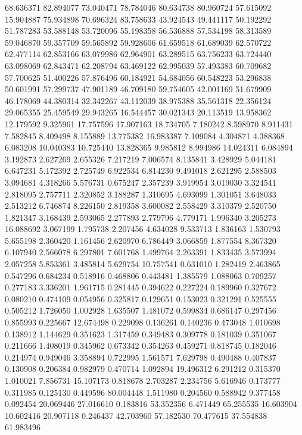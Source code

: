 68.636371
82.894077
73.040471
78.784046
80.634738
80.960724
57.615092
15.904887
75.934898
70.696324
83.758633
43.924543
49.441117
50.192292
51.787283
53.588148
53.720096
55.198358
56.536888
57.534198
58.313589
59.046870
59.357709
59.565892
59.928606
61.659518
61.689039
62.570722
62.477114
62.853166
63.079986
62.964901
63.289515
63.756233
63.724440
63.098069
62.843471
62.208794
63.469122
62.995039
57.493383
60.709682
57.700625
51.400226
57.876496
60.184921
54.684056
60.548223
53.296838
50.601991
57.299737
47.901189
46.709180
59.754605
42.001169
51.679909
46.178069
44.380314
32.342267
43.112039
38.975388
35.561318
22.356124
29.065355
25.459549
29.943265
16.544457
30.021343
20.113519
13.958362
12.179592
9.325961
17.757596
17.907163
18.734705
7.180242
8.598970
8.911431
7.582845
8.409498
8.155889
13.775382
16.983387
7.109084
4.304871
4.388368
6.083208
10.040383
10.725440
13.828365
9.985812
8.994986
14.024311
6.084894
3.192873
2.627269
2.655326
7.217219
7.006574
8.135841
3.428929
5.044181
6.647231
5.172392
2.725749
6.922534
6.814230
9.491018
2.621295
2.588503
3.094681
4.318266
5.576731
0.675247
2.357239
3.919954
3.019030
3.324541
2.818095
2.757711
2.320852
3.188287
1.310695
4.693099
1.301051
3.648033
2.513212
6.746874
8.226150
2.819358
3.600082
2.558429
3.310379
2.520750
1.821347
3.168439
2.593065
2.277893
2.779796
4.779171
1.996340
3.205273
16.088692
3.067199
1.795738
2.207456
4.634028
9.533713
1.836163
1.530793
5.655198
2.360420
1.161456
2.620970
6.786449
3.066859
1.877554
8.367320
6.107940
2.566078
6.297801
7.601768
1.499764
2.263391
1.833435
3.573994
2.057258
5.853361
3.485814
5.629754
10.757541
0.631010
1.282419
2.463865
0.547296
0.684234
0.518916
0.468806
0.443481
1.385579
1.088063
0.709257
0.277183
3.336201
1.961715
0.281445
0.394622
0.227224
0.189960
0.327672
0.080210
0.474109
0.054956
0.325817
0.129651
0.153023
0.321291
0.525555
0.505212
1.726050
1.002928
1.635507
1.481072
0.599834
0.686147
0.297456
0.855993
0.225667
12.674498
0.229098
0.136261
0.140236
0.473048
1.010698
0.138912
1.144629
0.351623
1.317459
0.349483
0.309778
0.181039
0.351067
0.211666
1.408019
0.345962
0.673342
0.354263
0.459271
0.818745
0.182046
0.214974
0.949046
3.358894
0.722995
1.561571
7.629798
0.490488
0.407837
0.130908
0.206384
0.982979
0.470714
1.092894
19.496312
6.291212
0.315370
1.010021
7.856731
15.107173
0.818678
2.703287
2.234756
5.616946
0.173777
0.311985
0.125130
0.449596
80.004448
1.511980
0.204560
0.588942
9.377458
0.092454
20.069446
27.016610
0.183816
53.352356
6.471449
65.255535
16.603904
10.602416
20.907118
0.246437
42.703960
57.182530
70.477615
37.554838
61.983496
